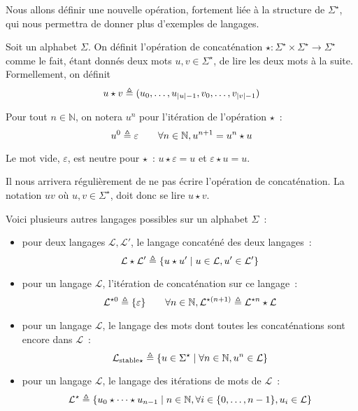 Nous allons définir une nouvelle opération, fortement liée à la structure de
$\Sigma^\star$, qui nous permettra de donner plus d'exemples de langages.

\begin{definition}[Concaténation]
  Soit un alphabet $\Sigma$. On définit l'opération de concaténation
  $\star : \Sigma^\star\times\Sigma^\star\to\Sigma^\star$ comme le fait, étant
  donnés deux mots $u,v\in\Sigma^\star$, de lire les deux mots à la suite.
  Formellement, on définit
  \[u\star v \triangleq (u_0,\ldots,u_{|u|-1},v_0,\ldots,v_{|v|-1})\]

  Pour tout $n\in \mathbb N$, on notera $u^n$ pour l'itération de l'opération
  $\star$~:
  \[u^0 \triangleq \varepsilon \qquad
  \forall n \in \mathbb N, u^{n+1} = u^n \star u\]
\end{definition}

\begin{remark}
  Le mot vide, $\varepsilon$, est neutre pour $\star$~: $u\star\varepsilon = u$
  et $\varepsilon \star u = u$.
\end{remark}

\begin{notation}
  Il nous arrivera régulièrement de ne pas écrire l'opération de concaténation.
  La notation $uv$ où $u,v\in \Sigma^\star$, doit donc se lire $u\star v$.
\end{notation}

\begin{example}
  Voici plusieurs autres langages possibles sur un alphabet $\Sigma$~:
  \begin{itemize}
  \item pour deux langages $\mathcal L, \mathcal L'$, le langage concaténé des
    deux langages~:
    \[\mathcal L\star\mathcal L'\triangleq
    \{u\star u'\mid u \in \mathcal L, u' \in \mathcal L' \}\]
  \item pour un langage $\mathcal L$, l'itération de concaténation sur ce
    langage~:
    \[\mathcal L^{\star 0} \triangleq \{\varepsilon\}\qquad
    \forall n \in \mathbb N, \mathcal L^{\star(n+1)} \triangleq
    \mathcal L^{\star n}\star\mathcal L\]
  \item pour un langage $\mathcal L$, le langage des mots dont toutes les
    concaténations sont encore dans $\mathcal L$~:
    \[\mathcal L_{\mathrm{stable}\star}\triangleq
    \{u\in \Sigma^\star\mid \forall n \in \mathbb N, u^n \in \mathcal L\}\]
  \item pour un langage $\mathcal L$, le langage des itérations de mots de
    $\mathcal L$~:
    \[\mathcal L^\star \triangleq
    \{u_0\star\cdots\star u_{n-1}\mid
    n \in \mathbb N, \forall i\in \{0,\ldots,n -1\}, u_i \in \mathcal L\}\]
  \end{itemize}
\end{example}

